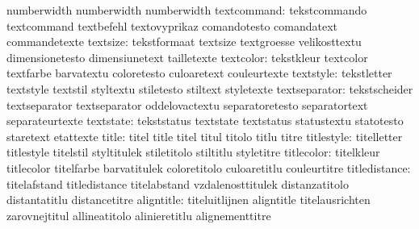             numberwidth   numberwidth
             numberwidth
              textcommand: tekstcommando             textcommand
                           textbefehl                textovyprikaz
                           comandotesto              comandatext
                           commandetexte
                 textsize: tekstformaat              textsize
                           textgroesse               velikosttextu
                           dimensionetesto           dimensiunetext
                           tailletexte
                textcolor: tekstkleur                textcolor
                           textfarbe                 barvatextu
                           coloretesto               culoaretext
                           couleurtexte
                textstyle: tekstletter               textstyle
                           textstil                  styltextu
                           stiletesto                stiltext
                           styletexte
            textseparator: tekstscheider             textseparator
                           textseparator             oddelovactextu
                           separatoretesto           separatortext
                           separateurtexte
                textstate: tekststatus               textstate
                           textstatus                statustextu
                           statotesto                staretext
                           etattexte
                    title: titel                     title
                           titel                     titul
                           titolo                    titlu
                           titre
               titlestyle: titelletter               titlestyle
                           titelstil                 styltitulek
                           stiletitolo               stiltitlu
                           styletitre
               titlecolor: titelkleur                titlecolor
                           titelfarbe                barvatitulek
                           coloretitolo              culoaretitlu
                           couleurtitre
            titledistance: titelafstand              titledistance
                           titelabstand              vzdalenosttitulek
                           distanzatitolo            distantatitlu
                           distancetitre
               aligntitle: titeluitlijnen            aligntitle
                           titelausrichten           zarovnejtitul
                           allineatitolo             alinieretitlu
                           alignementtitre
